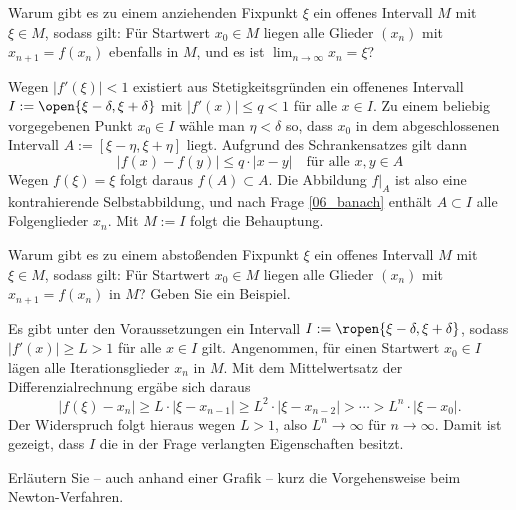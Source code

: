 \begin{frage}
  Warum gibt es zu einem anziehenden 
  Fixpunkt $\xi$ ein offenes Intervall $M$ mit $\xi \in M$, 
  sodass gilt: Für  
  Startwert $x_0\in M$ liegen alle Glieder $(x_n)$ mit 
  $x_{n+1}=f(x_n)$ ebenfalls in $M$, und es ist 
  $\lim_{n\to\infty} x_n = \xi$?
\end{frage}

\begin{antwort}
  Wegen $|f'(\xi)|<1$ existiert aus Stetigkeitsgründen 
  ein offenenes Intervall $I:=\open{\xi-\delta, \xi+\delta}$ mit 
  $|f'(x)|\le q<1$ für alle $x\in I$. 
  Zu einem beliebig vorgegebenen Punkt $x_0 \in I$ wähle man 
  $\eta<\delta$ so, dass $x_0$ in dem abgeschlossenen 
  Intervall $A:=[\xi-\eta, \xi+\eta]$ liegt. Aufgrund des Schrankensatzes 
  gilt dann
  \[
  | f(x)-f(y) | \le q \cdot |x-y| \quad\text{für alle $x,y\in A$}
  \]
  Wegen $f(\xi)=\xi$ folgt daraus $f(A)\subset A$. 
  Die Abbildung $f |_A  $ ist also eine kontrahierende 
  Selbstabbildung, und nach Frage \ref{06_banach} enthält
  $A\subset I$ alle Folgenglieder $x_n$.  
  Mit $M:=I$ folgt die Behauptung.  
  \AntEnd
\end{antwort}  

\begin{frage}
  Warum gibt es zu einem abstoßenden Fixpunkt $\xi$ ein offenes 
  Intervall $M$ mit $\xi \in M$, sodass gilt: 
  Für  Startwert $x_0\in M$ liegen alle Glieder $(x_n)$ mit 
  $x_{n+1}=f(x_n)$ in $M$? Geben Sie ein Beispiel.
\end{frage}

\begin{antwort}
  Es gibt unter den Voraussetzungen ein Intervall
  $I:=\ropen{\xi-\delta, \xi+\delta}$, 
  sodass $|f'(x)|\ge L > 1$ für alle $x\in I$ gilt. 
  Angenommen, für einen Startwert $x_0\in I$ 
  lägen alle Iterationsglieder $x_n$ in $M$. 
  Mit dem Mittelwertsatz der 
  Differenzialrechnung ergäbe sich daraus
  \[
  | f(\xi) - x_n | \ge L\cdot | \xi - x_{n-1} | \ge 
  L^2 \cdot | \xi - x_{n-2} | > \cdots > L^n \cdot | \xi - x_0 |.
  \]
  Der Widerspruch folgt hieraus wegen $L>1$, 
  also $L^n \to \infty$ für $n\to \infty$. 
  Damit ist gezeigt, dass $I$ die 
  in der Frage verlangten Eigenschaften besitzt.
  \AntEnd 
\end{antwort}

\begin{frage}\label{07_newtondef}
  Erläutern Sie -- auch anhand einer Grafik -- kurz die Vorgehensweise 
  beim Newton-Verfahren.
\end{frage}

